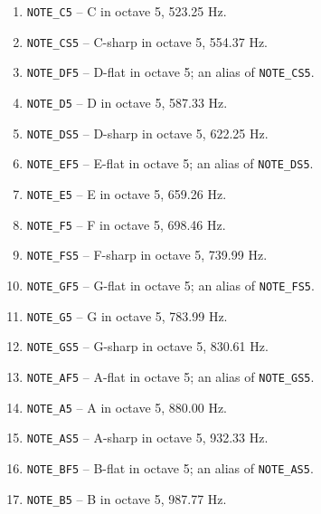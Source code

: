 \begin{enumerate}
    \item \texttt{NOTE\_C5} -- C in octave 5, 523.25 Hz.
    \item \texttt{NOTE\_CS5} -- C-sharp in octave 5, 554.37 Hz.
    \item \texttt{NOTE\_DF5} -- D-flat in octave 5; an alias of \texttt{NOTE\_CS5}.
    \item \texttt{NOTE\_D5} -- D in octave 5, 587.33 Hz.
    \item \texttt{NOTE\_DS5} -- D-sharp in octave 5, 622.25 Hz.
    \item \texttt{NOTE\_EF5} -- E-flat in octave 5; an alias of \texttt{NOTE\_DS5}.
    \item \texttt{NOTE\_E5} -- E in octave 5, 659.26 Hz.
    \item \texttt{NOTE\_F5} -- F in octave 5, 698.46 Hz.
    \item \texttt{NOTE\_FS5} -- F-sharp in octave 5, 739.99 Hz.
    \item \texttt{NOTE\_GF5} -- G-flat in octave 5; an alias of \texttt{NOTE\_FS5}.
    \item \texttt{NOTE\_G5} -- G in octave 5, 783.99 Hz.
    \item \texttt{NOTE\_GS5} -- G-sharp in octave 5, 830.61 Hz.
    \item \texttt{NOTE\_AF5} -- A-flat in octave 5; an alias of \texttt{NOTE\_GS5}.
    \item \texttt{NOTE\_A5} -- A in octave 5, 880.00 Hz.
    \item \texttt{NOTE\_AS5} -- A-sharp in octave 5, 932.33 Hz.
    \item \texttt{NOTE\_BF5} -- B-flat in octave 5; an alias of \texttt{NOTE\_AS5}.
    \item \texttt{NOTE\_B5} -- B in octave 5, 987.77 Hz.


\end{enumerate}
